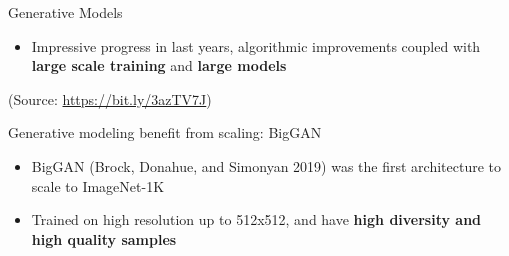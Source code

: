 \begin{frame}{Generative Models}
\protect\hypertarget{generative-models}{}

\begin{itemize}
\tightlist
\item
  Impressive progress in last years, algorithmic improvements coupled
  with \textbf{large scale training} and \textbf{large models}
\end{itemize}


(Source: \url{https://bit.ly/3azTV7J})

\end{frame}

\begin{frame}{Generative modeling benefit from scaling: BigGAN}
\protect\hypertarget{generative-modeling-benefit-from-scaling-biggan}{}

\begin{itemize}
\tightlist
\item
  BigGAN (Brock, Donahue, and Simonyan 2019) was the first architecture
  to scale to ImageNet-1K
\item
  Trained on high resolution up to 512x512, and have \textbf{high
  diversity and high quality samples}
\end{itemize}


\end{frame}

